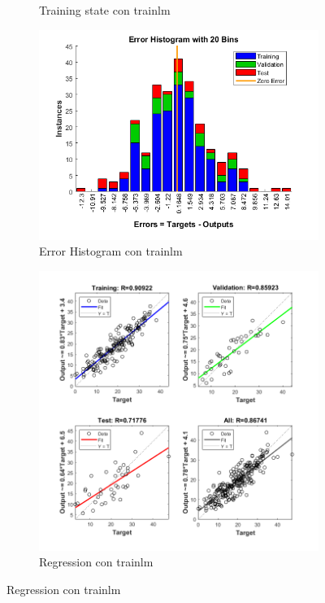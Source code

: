 \documentclass[a4paper, 12pt]{article}
\begin{document}
\begin{figure}[htp!]
\begin{subfigure}{0.49\textwidth}
                        \caption{Training state con trainlm}
                    \end{subfigure}
                    \begin{subfigure}{0.49\textwidth}
                        \includegraphics[width=\textwidth]{figures/parte1/Ej3/Ej3_error_trainlm.png}
                        \caption{Error Histogram con trainlm}
                    \end{subfigure}
                    \begin{subfigure}{0.49\textwidth}
                        \includegraphics[width=\textwidth]{figures/parte1/Ej3/Ej3_regression_trainlm.png}
                        \caption{Regression con trainlm}
                    \end{subfigure}
                \end{figure}
\end{document}
